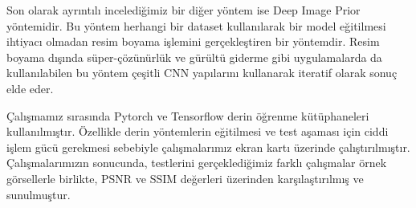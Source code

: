 Son olarak ayrıntılı incelediğimiz bir diğer yöntem ise Deep Image Prior yöntemidir. Bu yöntem herhangi bir dataset kullanılarak bir model eğitilmesi ihtiyacı olmadan resim boyama işlemini gerçekleştiren bir yöntemdir. Resim boyama dışında süper-çözünürlük ve gürültü giderme gibi uygulamalarda da kullanılabilen bu yöntem çeşitli CNN yapılarını kullanarak iteratif olarak sonuç elde eder. 

Çalışmamız sırasında Pytorch ve Tensorflow derin öğrenme kütüphaneleri kullanılmıştır. Özellikle derin yöntemlerin eğitilmesi ve test aşaması için ciddi işlem gücü gerekmesi sebebiyle çalışmalarımız ekran kartı üzerinde çalıştırılmıştır. Çalışmalarımızın sonucunda, testlerini gerçeklediğimiz farklı çalışmalar örnek görsellerle birlikte, PSNR ve SSIM değerleri üzerinden karşılaştırılmış ve sunulmuştur.